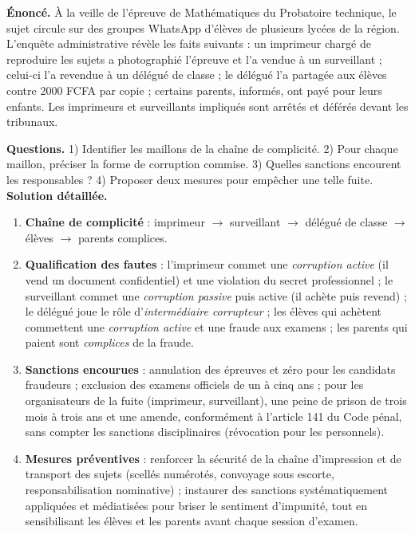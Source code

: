 \documentclass[11pt]{article}
\begin{document}
\begin{exoresolu}
\textbf{Énoncé.} À la veille de l'épreuve de Mathématiques du Probatoire technique, le sujet circule sur des groupes WhatsApp d'élèves de plusieurs lycées de la région. L'enquête administrative révèle les faits suivants : un imprimeur chargé de reproduire les sujets a photographié l'épreuve et l'a vendue à un surveillant ; celui-ci l'a revendue à un délégué de classe ; le délégué l'a partagée aux élèves contre \num{2000} FCFA par copie ; certains parents, informés, ont payé pour leurs enfants. Les imprimeurs et surveillants impliqués sont arrêtés et déférés devant les tribunaux.

\textbf{Questions.} 1) Identifier les maillons de la chaîne de complicité. 2) Pour chaque maillon, préciser la forme de corruption commise. 3) Quelles sanctions encourent les responsables ? 4) Proposer deux mesures pour empêcher une telle fuite.
\tcblower
\textbf{Solution détaillée.}
\begin{enumerate}
\item \textbf{Chaîne de complicité} : imprimeur $\rightarrow$ surveillant $\rightarrow$ délégué de classe $\rightarrow$ élèves $\rightarrow$ parents complices.
\item \textbf{Qualification des fautes} : l'imprimeur commet une \emph{corruption active} (il vend un document confidentiel) et une violation du secret professionnel ; le surveillant commet une \emph{corruption passive} puis active (il achète puis revend) ; le délégué joue le rôle d'\emph{intermédiaire corrupteur} ; les élèves qui achètent commettent une \emph{corruption active} et une fraude aux examens ; les parents qui paient sont \emph{complices} de la fraude.
\item \textbf{Sanctions encourues} : annulation des épreuves et zéro pour les candidats fraudeurs ; exclusion des examens officiels de un à cinq ans ; pour les organisateurs de la fuite (imprimeur, surveillant), une peine de prison de trois mois à trois ans et une amende, conformément à l'article 141 du Code pénal, sans compter les sanctions disciplinaires (révocation pour les personnels).
\item \textbf{Mesures préventives} : renforcer la sécurité de la chaîne d'impression et de transport des sujets (scellés numérotés, convoyage sous escorte, responsabilisation nominative) ; instaurer des sanctions systématiquement appliquées et médiatisées pour briser le sentiment d'impunité, tout en sensibilisant les élèves et les parents avant chaque session d'examen.
\end{enumerate}
\end{exoresolu}
\end{document}
